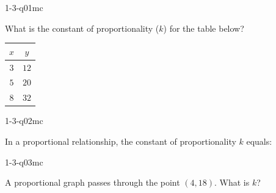 

\begin{practiceQuestion}{1-3-q01}{mc}
\begin{questionText}
What is the constant of proportionality ($k$) for the table below?

\begin{center}
\begin{tabular}{|c|c|}
\hline $x$ & $y$ \\ \hline $3$ & $12$ \\ $5$ & $20$ \\ $8$ & $32$ \\ \hline
\end{tabular}
\end{center}
\end{questionText}
\end{practiceQuestion}

\begin{practiceQuestion}{1-3-q02}{mc}
\begin{questionText}
In a proportional relationship, the constant of proportionality $k$ equals:
\end{questionText}
\end{practiceQuestion}

\begin{practiceQuestion}{1-3-q03}{mc}
\begin{questionText}
A proportional graph passes through the point $(4, 18)$. What is $k$?
\end{questionText}
\end{practiceQuestion}

